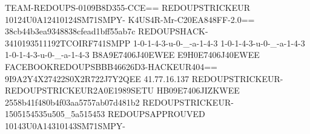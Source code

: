 TEAM-REDOUPS-0109B8D355-CCE==
REDOUPSTRICKEUR 10124U0A12410124SM71SMPY-
K4US4R-Mr-C20EA848FF-2.0==
38cb44b3ea9348838cfead1bff55ab7c
REDOUPSHACK-3410193511192TCOIRF741SMPP
1-0-1-4-3-u-0-_-a-1-4-3
1-0-1-4-3-u-0-_-a-1-4-3
1-0-1-4-3-u-0-_-a-1-4-3
B8A9E7406J40EWEE
E9H0E7406J40EWEE
FACEBOOKREDOUPSBBB46626D3-HACKEUR404==
9I9A2Y4X27422S0X2R722J7Y2QEE
41.77.16.137
REDOUPSTRICKEUR-REDOUPSTRICKEUR2A0E1989SETU
HB09E7406JIZKWEE
2558b41f480b4f03aa5757ab07d481b2
REDOUPSTRICKEUR-1505154535u505_5a515453
REDOUPSAPPROUVED 10143U0A14310143SM71SMPY-
